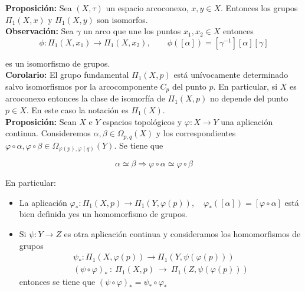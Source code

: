 \documentclass{article}
\begin{document}
\textbf{Proposición:} Sea $(X,\tau)$ un espacio arcoconexo, $x,y\in X$. Entonces los grupos $\Pi_1(X,x)$ y $\Pi_1(X,y)$ son isomorfos.\\

\textbf{Observación:} Sea $\gamma$ un arco que une los puntos $x_1,x_2\in X$ entonces 
\begin{equation*}
\phi:\Pi_1(X,x_1)\rightarrow \Pi_1(X,x_2),\qquad \phi([\alpha])=[\gamma^{-1}][\alpha][\gamma]
\end{equation*}

es un isomorfismo de grupos. \\

\textbf{Corolario:} El grupo fundamental $\Pi_1(X,p)$ está unívocamente determinado salvo isomorfismos por la arcocomponente $C_p$ del punto $p$. En particular, si $X$ es arcoconexo entonces la clase de isomorfía de $\Pi_1(X,p)$ no depende del punto $p\in X$. En este caso la notación es $\Pi_1(X)$. \\

\textbf{Proposición:} Sean $X$ e $Y$ espacios topológicos y $\varphi:X\rightarrow Y$ una aplicación continua. Consideremos $\alpha,\beta\in \Omega_{p,q}(X)$ y los correspondientes $\varphi\circ\alpha,\varphi\circ\beta\in \Omega_{\varphi(p),\varphi(q)}(Y)$. Se tiene que

\begin{equation*}
\alpha\simeq \beta \Rightarrow \varphi\circ \alpha \simeq \varphi\circ\beta
\end{equation*}

En particular:
\begin{itemize}
\item La aplicación $\varphi_*:\Pi_1(X,p)\rightarrow \Pi_1(Y,\varphi(p)),\quad\varphi_*([\alpha])=[\varphi\circ\alpha]$ está bien definida yes un homomorfismo de grupos.

\item Si $\psi:Y\rightarrow Z$ es otra aplicación continua y consideramos los homomorfismos de grupos 
\begin{gather*}
\psi_*:\Pi_1(X,\varphi(p))\rightarrow \Pi_1(Y,\psi(\varphi(p)))\\(\psi\circ\varphi)_*~:~\Pi_1(X,p)~\rightarrow~\Pi_1(Z,\psi(\varphi(p)))
\end{gather*}
entonces se tiene que $(\psi\circ\varphi)_*=\psi_*\circ\varphi_*$
\end{itemize}
\end{document}
